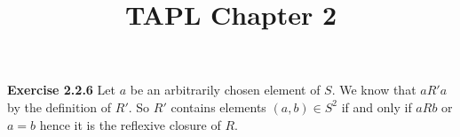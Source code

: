 \documentclass{article}
\title{TAPL Chapter 2}
\begin{document}
\textbf{Exercise 2.2.6}
Let $a$ be an arbitrarily chosen element of $S$. We know that $a R' a$ by the
definition of $R'$. So $R'$ contains elements $(a, b) \in S^2$ if and only if
$a R b$ or $a = b$ hence it is the reflexive closure of $R$.
\end{document}
